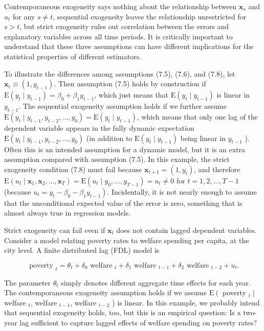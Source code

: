\documentclass[10pt]{article}
\begin{document}
Contemporaneous exogeneity says nothing about the relationship between $\mathbf{x}_{s}$ and $u_{t}$ for any $s \neq t$, sequential exogeneity leaves the relationship unrestricted for $s>t$, but strict exogeneity rules out correlation between the errors and explanatory variables across all time periods. It is critically important to understand that these three assumptions can have different implications for the statistical properties of different estimators.

To illustrate the differences among assumptions (7.5), (7.6), and (7.8), let $\mathbf{x}_{t} \equiv \left(1, y_{t-1}\right)$. Then assumption (7.5) holds by construction if $\mathrm{E}\left(y_{t} \mid y_{t-1}\right)=\beta_{0}+\beta_{1} y_{t-1}$, which just means that $\mathrm{E}\left(y_{t} \mid y_{t-1}\right)$ is linear in $y_{t-1}$. The sequential exogeneity assumption holds if we further assume $\mathrm{E}\left(y_{t} \mid y_{t-1}, y_{t-2}, \ldots, y_{0}\right)=\mathrm{E}\left(y_{t} \mid y_{t-1}\right)$, which means that only one lag of the dependent variable appears in the fully dynamic expectation $\mathrm{E}\left(y_{t} \mid y_{t-1}, y_{t-2}, \ldots, y_{0}\right)$ (in addition to $\mathrm{E}\left(y_{t} \mid y_{t-1}\right)$ being linear in $y_{t-1}$ ). Often this is an intended assumption for a dynamic model, but it is an extra assumption compared with assumption (7.5). In this example, the strict exogeneity condition (7.8) must fail because $\mathbf{x}_{t+1}=\left(1, y_{t}\right)$, and therefore $\mathrm{E}\left(u_{t} \mid \mathbf{x}_{1}, \mathbf{x}_{2}, \ldots, \mathbf{x}_{T}\right)= \mathrm{E}\left(u_{t} \mid y_{0}, \ldots, y_{T-1}\right)=u_{t} \neq 0$ for $t=1,2, \ldots, T-1$ (because $\left.u_{t}=y_{t}-\beta_{0}-\beta_{1} y_{t-1}\right)$. Incidentally, it is not nearly enough to assume that the unconditional expected value of the error is zero, something that is almost always true in regression models.

Strict exogeneity can fail even if $\mathbf{x}_{t}$ does not contain lagged dependent variables. Consider a model relating poverty rates to welfare spending per capita, at the city level. A finite distributed lag (FDL) model is


\begin{equation*}
\text { poverty }_{t}=\theta_{t}+\delta_{0} \text { welfare }_{t}+\delta_{1} \text { welfare }_{t-1}+\delta_{2} \text { welfare }_{t-2}+u_{t} . \tag{7.9}
\end{equation*}


The parameter $\theta_{t}$ simply denotes different aggregate time effects for each year. The contemporaneous exogeneity assumption holds if we assume $\mathrm{E}\left(\right.$ poverty $_{t} \mid$ welfare $_{t}$, welfare $_{t-1}$, welfare $_{t-2}$ ) is linear. In this example, we probably intend that sequential exogeneity holds, too, but this is an empirical question: Is a two-year lag sufficient to capture lagged effects of welfare spending on poverty rates?
\end{document}
